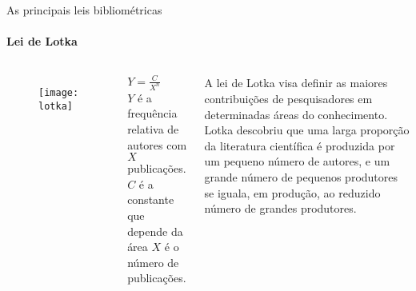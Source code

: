 \begin{frame}[t]{As principais leis bibliométricas}
    \framesubtitle{Lei de Lotka}
       
          

    \begin{columns}

        \begin{figure}
            \texttt{[image: lotka]}
        \end{figure}

        \centering
        $Y = \frac{C}{X^n}$\\
        $Y$ \scriptsize{é a frequência relativa de autores com $X$ publicações.}\\
        $C$ \scriptsize{é a constante que depende da área $X$ é o número de publicações.}

        A lei de Lotka visa definir as maiores contribuições de pesquisadores em determinadas áreas do conhecimento.\\
            Lotka descobriu que uma larga proporção da literatura científica é produzida por um pequeno número de autores, e um grande número de pequenos produtores se iguala, em produção, ao reduzido número de grandes produtores.
    \end{columns}

    \vspace*{0.2cm}

\end{frame}
